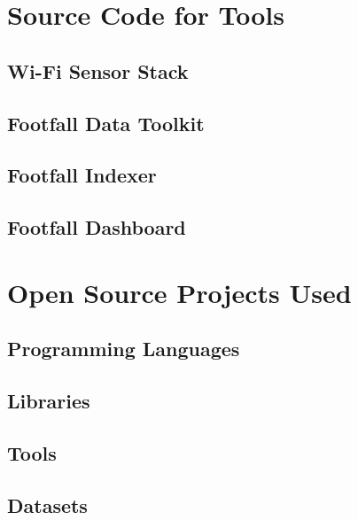 \appendix

\chapter{Source Code for Tools}

\section{Wi-Fi Sensor Stack}

\section{Footfall Data Toolkit}

\section{Footfall Indexer}

\section{Footfall Dashboard}

\chapter{Open Source Projects Used}

\section{Programming Languages}

\section{Libraries}

\section{Tools}

\section{Datasets}



